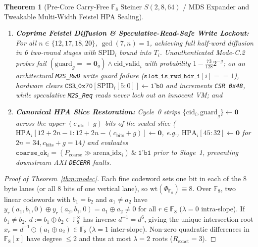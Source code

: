 \documentclass[10pt,twocolumn]{article}
\theoremstyle{spectralthm}
\newtheorem{theorem}{Theorem}[section]
\begin{document}
\begin{theorem}[Pre-Core Carry-Free $\mathbb{F}_8$ Steiner $S(2,8,64)$ / MDS Expander and Tweakable Multi-Width Feistel HPA Sealing]
\begin{enumerate}
  \item[(ii)] \textbf{Coprime Feistel Diffusion \& Speculative-Read-Safe Write Lockout:} For all $n \in \{12, 17, 18, 20\}$, $\gcd(7,n) = 1$, achieving full half-word diffusion in 6 two-round stages with $\mathrm{SPID}_i$ bound into $T_i$. Unauthenticated Mode-C.2 probes fail $(\mathrm{guard}_g == \mathbf{0}_g) \wedge \mathrm{cid\_valid}_i$ with probability $1 - \frac{73}{128} 2^{-g}$; on an architectural \texttt{M2S\_RwD} write guard failure ($\texttt{slot\_is\_rwd\_hdr\_i}[i] == 1$), hardware clears $\texttt{CSR\_0x70}[\mathrm{SPID}_i[5:0]] \leftarrow \texttt{1'b0}$ and increments \texttt{CSR 0x48}, while speculative \texttt{M2S\_Req} reads never lock out an innocent VM; and
  \item[(iii)] \textbf{Canonical HPA Slice Restoration:} Cycle~0 strips $\{\mathrm{cid}_i, \mathrm{guard}_g\} \leftarrow \mathbf{0}$ across the upper $(c_{\mathrm{bits}}+g)$ bits of the sealed slice ($\mathrm{HPA}_i[12+2n-1 : 12+2n-(c_{\mathrm{bits}}+g)] \leftarrow \mathbf{0}$, e.g., $\mathrm{HPA}_i[45:32] \leftarrow \mathbf{0}$ for $2n=34, c_{\mathrm{bits}}+g=14$) and evaluates $\texttt{coarse\_ok}_i = (P_{\mathrm{coarse}} \gg \mathrm{arena\_idx}_i) \ \&\ \texttt{1'b1}$ prior to Stage~1, preventing downstream AXI \texttt{DECERR} faults.
\end{enumerate}
\end{theorem}
\begin{proof}[Proof of Theorem~\ref{thm:modec}]
Each fine codeword sets one bit in each of the 8 byte lanes (or all 8 bits of one vertical lane), so $\mathrm{wt}(\Phi_{\mathbb{F}_8}) \equiv 8$. Over $\mathbb{F}_8$, two linear codewords with $b_1 = b_2$ and $a_1 \neq a_2$ have $y_r(a_1,b_1,0) \oplus y_r(a_2,b_1,0) = a_1 \oplus a_2 \neq 0$ for all $r \in \mathbb{F}_8$ ($\lambda = 0$ intra-slope). If $b_1 \neq b_2$, $d := b_1 \oplus b_2 \in \mathbb{F}_8^\times$ has inverse $d^{-1} = d^6$, giving the unique intersection root $x_r = d^{-1} \odot (a_1 \oplus a_2) \in \mathbb{F}_8$ ($\lambda = 1$ inter-slope). Non-zero quadratic differences in $\mathbb{F}_8[x]$ have degree $\le 2$ and thus at most $\lambda = 2$ roots ($R_{\mathrm{exact}} = 3$).
\end{proof}
\end{document}

